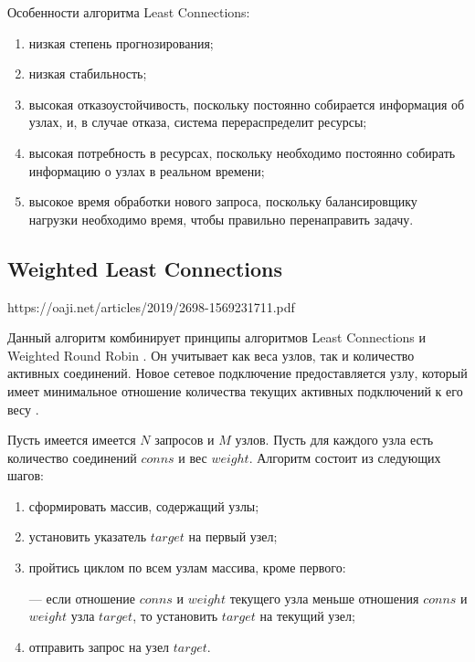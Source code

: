 Особенности алгоритма Least Connections:
\begin{enumerate}[label=---]
	\item низкая степень прогнозирования; 
	\item низкая стабильность;
	\item высокая отказоустойчивость, поскольку постоянно собирается информация об узлах, и, в случае отказа, система перераспределит ресурсы;
	\item высокая потребность в ресурсах, поскольку необходимо постоянно собирать информацию о узлах в реальном времени;
	\item высокое время обработки нового запроса, поскольку балансировщику нагрузки необходимо время, чтобы правильно перенаправить задачу.
\end{enumerate}


\begin{comment}
Балансировка нагрузки по наименьшему количеству подключений --- это алгоритм динамической балансировки нагрузки, при котором запросы распределяются узлы с наименьшим количеством активных подключений на момент получения запроса \cite{leastconns}.

\end{comment}


\subsection{Weighted Least Connections}

https://oaji.net/articles/2019/2698-1569231711.pdf

Данный алгоритм комбинирует принципы алгоритмов Least Connections и Weighted Round Robin \cite{weightedroundrobin}. %
Он учитывает как веса узлов, так и количество активных соединений. 
Новое сетевое подключение предоставляется узлу, который имеет минимальное отношение количества текущих активных подключений к его весу \cite{mainsource}.

Пусть имеется имеется $N$ запросов и $M$ узлов. Пусть для каждого узла есть количество соединений $conns$ и вес $weight$.
Алгоритм состоит из следующих шагов:

\begin{enumerate}
	\item сформировать массив, содержащий узлы;
	\item установить указатель $target$ на первый узел;
	\item пройтись циклом по всем узлам массива, кроме первого:
	
	--- если отношение $conns$ и $weight$ текущего узла меньше отношения $conns$ и $weight$ узла $target$, то установить $target$ на текущий узел; 
	
	\item отправить запрос на узел $target$.
\end{enumerate}

